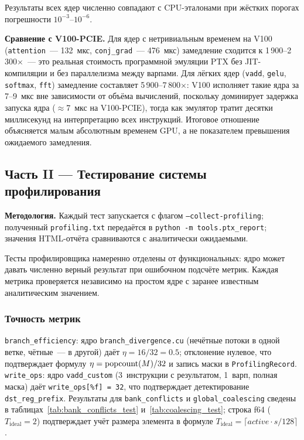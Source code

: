 Результаты всех ядер численно совпадают с CPU-эталонами при жёстких порогах погрешности $10^{-3}$--$10^{-6}$.

\textbf{Сравнение с V100-PCIE.}
Для ядер с нетривиальным временем на V100 (\texttt{attention}~--- 132~мкс,
\texttt{conj\_grad}~--- 476~мкс) замедление сходится к 1\,900--2\,300$\times$~---
это реальная стоимость программной эмуляции PTX
без JIT-компиляции и без параллелизма между варпами.
Для лёгких ядер (\texttt{vadd}, \texttt{gelu}, \texttt{softmax}, \texttt{fft})
замедление составляет 5\,900--7\,800$\times$: V100 исполняет такие ядра
за 7--9~мкс вне зависимости от объёма вычислений, поскольку доминирует
задержка запуска ядра ($\approx$7~мкс на V100-PCIE), тогда как эмулятор
тратит десятки миллисекунд на интерпретацию всех инструкций.
Итоговое отношение объясняется малым абсолютным временем GPU,
а не показателем превышения ожидаемого замедления.

\subsection{Часть II --- Тестирование системы профилирования}

\textbf{Методология.} Каждый тест запускается с флагом \texttt{--collect-profiling};
полученный \texttt{profiling.txt} передаётся в \texttt{python -m tools.ptx\_report};
значения HTML-отчёта сравниваются с аналитически ожидаемыми.

Тесты профилировщика намеренно отделены от функциональных: ядро может давать
численно верный результат при ошибочном подсчёте метрик. Каждая метрика
проверяется независимо на простом ядре с заранее известным аналитическим значением.

\subsubsection{Точность метрик}

\texttt{branch\_efficiency}: ядро \texttt{branch\_divergence.cu} (нечётные потоки в одной ветке, чётные~--- в другой) даёт $\eta = 16/32 = 0.5$; отклонение нулевое, что подтверждает формулу $\eta = \mathrm{popcount}(M)/32$ и запись маски в \texttt{ProfilingRecord}.
\texttt{write\_ops}: ядро \texttt{vadd\_custom} (3~инструкции с результатом, 1~варп, полная маска) даёт \texttt{write\_ops[\%f] = 32}, что подтверждает детектирование \texttt{dst\_reg\_prefix}.
Результаты для \texttt{bank\_conflicts} и \texttt{global\_coalescing} сведены в таблицах~\ref{tab:bank_conflicts_test} и~\ref{tab:coalescing_test}; строка f64 ($T_{\mathrm{ideal}} = 2$) подтверждает учёт размера элемента в формуле $T_{\mathrm{ideal}} = \lceil \mathit{active} \cdot s / 128 \rceil$.

